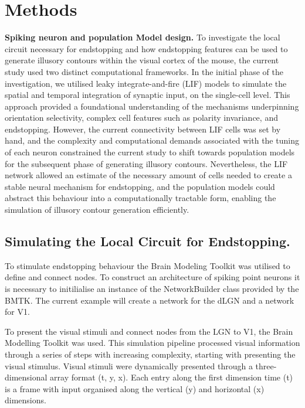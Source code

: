 \documentclass[12pt]{article}
\begin{document}
\section{Methods}
\noindent \textbf{Spiking neuron and population Model design.} \newline
To investigate the local circuit necessary for endstopping and how endstopping features can be used to generate illusory contours within the visual cortex of the mouse, the current study used two distinct computational frameworks. In the initial phase of the investigation, we utilised leaky integrate-and-fire (LIF) models to simulate the spatial and temporal integration of synaptic input, on the single-cell level. This approach provided a foundational understanding of the mechanisms underpinning orientation selectivity, complex cell features such as polarity invariance, and endstopping. However, the current connectivity between LIF cells was set by hand, and the complexity and computational demands associated with the tuning of each neuron constrained the current study to shift towards population models for the subsequent phase of generating illusory contours. Nevertheless, the LIF network allowed an estimate of the necessary amount of cells needed to create a stable neural mechanism for endstopping, and the population models could abstract this behaviour into a computationally tractable form, enabling the simulation of illusory contour generation efficiently. 

\bigbreak
\subsection{Simulating the Local Circuit for Endstopping.}

To stimulate endstopping behaviour the Brain Modeling Toolkit was utilised to define and connect nodes. To construct an architecture of spiking point neurons it is necessary to initilialise an instance of the NetworkBuilder class provided by the BMTK. The current example will create a network for the dLGN and a network for V1.

To present the visual stimuli and connect nodes from the LGN to V1, the Brain Modelling Toolkit was used. This simulation pipeline processed visual information through a series of steps with increasing complexity, starting with presenting the visual stimulus. Visual stimuli were dynamically presented through a three-dimensional array format (t, y, x). Each entry along the first dimension time (t) is a frame with input organised along the vertical (y) and horizontal (x) dimensions. 
\end{document}
